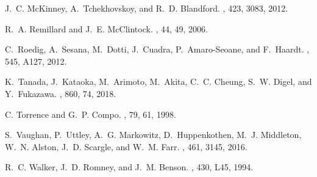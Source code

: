 \documentclass{iau}
\begin{document}
\begin{thebibliography}{}
J.~C. {McKinney}, A.~{Tchekhovskoy}, and R.~D. {Blandford}.
\newblock {\em \mnras}, 423, 3083, 2012.

R.~A. {Remillard} and J.~E. {McClintock}.
\newblock {\em \araa}, 44, 49, 2006.

C.~{Roedig}, A.~{Sesana}, M.~{Dotti}, J.~{Cuadra}, P.~{Amaro-Seoane}, and
  F.~{Haardt}.
\newblock {\em \aap}, 545, A127, 2012.

K.~{Tanada}, J.~{Kataoka}, M.~{Arimoto}, M.~{Akita}, C.~C. {Cheung}, S.~W.
  {Digel}, and Y.~{Fukazawa}.
\newblock {\em \apj}, 860, 74, 2018.

C. Torrence and G.~P. Compo.
, 79, 61, 1998.

S.~{Vaughan}, P.~{Uttley}, A.~G. {Markowitz}, D.~{Huppenkothen}, M.~J.
  {Middleton}, W.~N. {Alston}, J.~D. {Scargle}, and W.~M. {Farr}.
\newblock {\em \mnras}, 461, 3145, 2016.

R.~C. {Walker}, J.~D. {Romney}, and J.~M. {Benson}.
\newblock {\em \apjl}, 430, L45, 1994.

\end{thebibliography}
\end{document}
